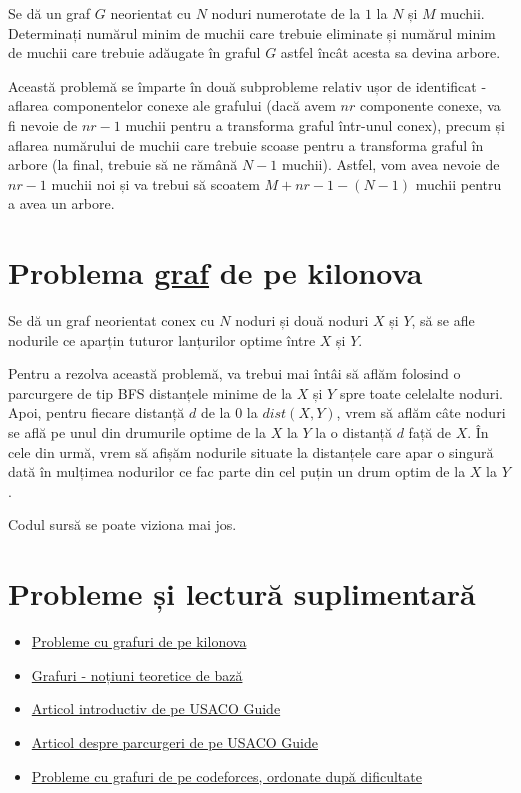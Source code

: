 Se dă un graf $G$ neorientat cu $N$ noduri numerotate de la $1$ la $N$ și $M$ muchii. Determinați numărul minim de muchii care trebuie eliminate și numărul minim de muchii care trebuie adăugate în graful $G$ astfel încât acesta sa devina arbore.

Această problemă se împarte în două subprobleme relativ ușor de identificat - aflarea componentelor conexe ale grafului (dacă avem $nr$ componente conexe, va fi nevoie de $nr - 1$ muchii pentru a transforma graful într-unul conex), precum și aflarea numărului de muchii care trebuie scoase pentru a transforma graful în arbore (la final, trebuie să ne rămână $N-1$ muchii). Astfel, vom avea nevoie de $nr - 1$ muchii noi și va trebui să scoatem $M + nr - 1 - (N - 1)$ muchii pentru a avea un arbore. 


\section{Problema \href{https://kilonova.ro/problems/49}{graf} de pe kilonova}

Se dă un graf neorientat conex cu $N$ noduri și două noduri $X$ și $Y$, să se afle nodurile ce aparțin tuturor lanțurilor optime între $X$ și $Y$.

Pentru a rezolva această problemă, va trebui mai întâi să aflăm folosind o parcurgere de tip BFS distanțele minime de la $X$ și $Y$ spre toate celelalte noduri. Apoi, pentru fiecare distanță $d$ de la $0$ la $dist(X, Y)$, vrem să aflăm câte noduri se află pe unul din drumurile optime de la $X$ la $Y$ la o distanță $d$ față de $X$. În cele din urmă, vrem să afișăm nodurile situate la distanțele care apar o singură dată în mulțimea nodurilor ce fac parte din cel puțin un drum optim de la $X$ la $Y$.

Codul sursă se poate viziona mai jos. 


\section{Probleme și lectură suplimentară}

\begin{itemize}
\item \href{https://kilonova.ro/tags/300}{Probleme cu grafuri de pe kilonova}
\item \href{https://cppi.sync.ro/materia/grafuri_arbori_notiuni_teoretice_de_baza.html}{Grafuri - noțiuni teoretice de bază}
\item \href{https://usaco.guide/bronze/intro-graphs?lang=cpp}{Articol introductiv de pe USACO Guide}
\item \href{https://usaco.guide/silver/graph-traversal?lang=cpp}{Articol despre parcurgeri de pe USACO Guide}
\item \href{https://codeforces.com/problemset?order=BY_RATING_ASC&tags=combine-tags-by-or%2Cgraphs%2Cdfs+and+similar}{Probleme cu grafuri de pe codeforces, ordonate după dificultate}

\end{itemize}
